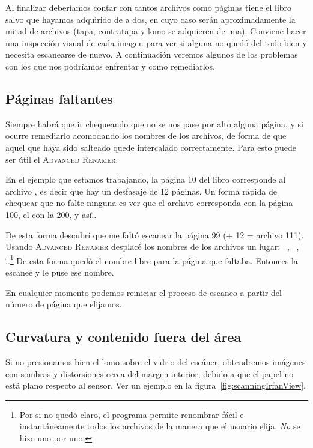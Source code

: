 \documentclass[%
	a5paper,
	10pt,
	twoside,
	openright,
	final,
]{memoir}
\begin{document}
	Al finalizar deberíamos contar con tantos archivos como páginas tiene el libro salvo que hayamos adquirido de a dos, en cuyo caso serán aproximadamente la mitad de archivos (tapa, contratapa y lomo se adquieren de una). Conviene hacer una inspección visual de cada imagen para ver si alguna no quedó del todo bien y necesita escanearse de nuevo. A continuación veremos algunos de los problemas con los que nos podríamos enfrentar y como remediarlos.

	\subsection{Páginas faltantes} Siempre habrá que ir chequeando que no se nos pase por alto alguna página, y si ocurre remediarlo acomodando los nombres de los archivos, de forma de que aquel que haya sido salteado quede intercalado correctamente. Para esto puede ser útil el \textsc{Advanced Renamer}.

	En el ejemplo que estamos trabajando, la página 10 del libro corresponde al archivo , es decir que hay un desfasaje de 12 páginas. Un forma rápida de chequear que no falte ninguna es ver que el archivo  corresponda con la página 100, el  con la 200, y así\...

	De esta forma descubrí que me faltó escanear la página 99 (+ 12 = archivo 111). Usando \textsc{Advanced Renamer} desplacé los nombres de los archivos un lugar:  \faLongArrowAltRight\ ,  \faLongArrowAltRight\ , \...\footnote{Por si no quedó claro, el programa permite renombrar fácil e instantáneamente todos los archivos de la manera que el usuario elija. \emph{No} se hizo uno por uno.} De esta forma quedó el nombre  libre para la página que faltaba. Entonces la escaneé y le puse ese nombre.

	En cualquier momento podemos reiniciar el proceso de escaneo a partir del número de página que elijamos.

	\subsection{Curvatura y contenido fuera del área} Si no presionamos bien el lomo sobre el vidrio del escáner, obtendremos imágenes con sombras y distorsiones cerca del margen interior, debido a que el papel no está plano respecto al sensor. Ver un ejemplo en la figura~\ref{fig:scanningIrfanView}.
\end{document}
